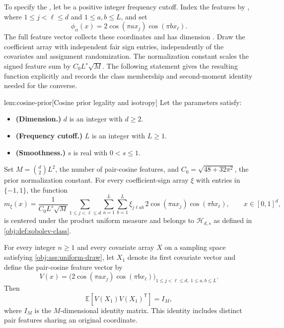 \documentclass[11pt]{article}
\begin{document}
To specify the , let  be a positive integer frequency cutoff. Index the features by , where \(1\leq j<\ell\leq d\) and \(1\leq a,b\leq L\), and set
\[
\phi_\alpha(x)=2\cos(\pi a x_j)\cos(\pi b x_\ell).
\]
The full feature vector  collects these coordinates and has dimension . Draw the coefficient array  with independent fair sign entries, independently of the covariates and assignment randomization. The normalization constant  scales the signed feature sum by \(C_0L^s\sqrt M\). The following statement gives the resulting function explicitly and records the class membership and second-moment identity needed for the converse.

\begin{lemmav}{lem:cosine-prior}[Cosine prior legality and isotropy]
Let the parameters satisfy:
\begin{itemize}
\item \textbf{(Dimension.)} \(d\) is an integer with \(d\geq2\).
\item \textbf{(Frequency cutoff.)} \(L\) is an integer with \(L\geq1\).
\item \textbf{(Smoothness.)} \(s\) is real with \(0<s\leq1\).
\end{itemize}
Set \(M=\binom{d}{2}L^2\), the number of pair-cosine features, and \(C_0=\sqrt{48+32\pi^2}\), the prior normalization constant. For every coefficient-sign array \(\xi\) with entries in \(\{-1,1\}\), the function
\[
m_\xi(x)=
\frac{1}{C_0L^s\sqrt M}
\sum_{1\leq j<\ell\leq d}\sum_{a=1}^{L}\sum_{b=1}^{L}
\xi_{j\ell ab}\,2\cos(\pi a x_j)\cos(\pi b x_\ell),
\qquad x\in[0,1]^d,
\]
is centered under the product uniform measure and belongs to \(\mathcal H_{d,s}\) as defined in \cref{obj:def:sobolev-class}.

For every integer \(n\geq1\) and every covariate array \(X\) on a sampling space satisfying \cref{obj:ass:uniform-draw}, let \(X_1\) denote its first covariate vector and define the pair-cosine feature vector by
\[
V(x)=
\bigl(2\cos(\pi a x_j)\cos(\pi b x_\ell)\bigr)_{
1\leq j<\ell\leq d,\;1\leq a,b\leq L}.
\]
Then
\[
\mathbb E\!\left[V(X_1)V(X_1)^{\mathsf T}\right]=I_M,
\]
where \(I_M\) is the \(M\)-dimensional identity matrix. This identity includes distinct pair features sharing an original coordinate.
\end{lemmav}
\end{document}
